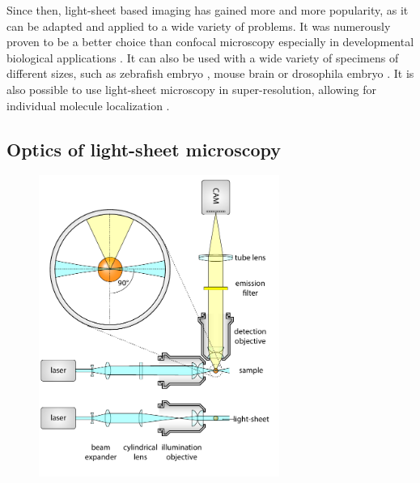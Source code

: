   Since then, light-sheet based imaging has gained more and more popularity, as it can be adapted and applied to a wide variety of problems. It was numerously proven to be a better choice than confocal microscopy \cite{reynaud_light_2008,huisken_selective_2009} especially in developmental biological applications \cite{weber_light_2011}. It can also be used with a wide variety of specimens of different sizes, such as zebrafish embryo \cite{keller_reconstruction_2008,kaufmann_multilayer_2012,mickoleit_high-resolution_2014}, mouse brain \cite{dodt_ultramicroscopy:_2007,} or drosophila embryo \cite{krzic_multiview_2012}. It is also possible to use light-sheet microscopy in super-resolution, allowing for individual molecule localization \cite{cella_zanacchi_live-cell_2011}.


  \subsection{Optics of light-sheet microscopy}

    
    \begin{figure}[htpb]
        \centering
        \includegraphics[page=1,width=0.7\textwidth]{spim_cyl}
        \label{fig:light-sheet}
    \end{figure}

